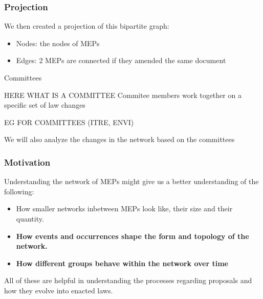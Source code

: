 \documentclass{beamer}
\begin{document}
\begin{frame}
\frametitle{Projection}

We then created a projection of this bipartite graph:

\begin{itemize}
	\pause \item Nodes: the nodes of MEPs
	\pause \item Edges: 2 MEPs are connected if they amended the same document	
\end{itemize}



\end{frame}


\begin{frame}{Committees}

	HERE WHAT IS A COMMITTEE 
	\pause Commitee members work together on a specific set of law changes

	EG FOR COMMITTEES (ITRE, ENVI)
	\vspace{2mm}
	
	\pause We will also analyze the changes in the network based on the committees
	
\end{frame}

\begin{frame}
\frametitle{Motivation}

Understanding the network of MEPs might give us a better understanding of the following:

\bigskip

\begin{itemize}
	\pause \item How smaller networks inbetween MEPs look like, their size and their quantity.
	
	\pause \item \textbf{How events and occurrences shape the form and topology of the network.}
		
	\pause \item \textbf{How different groups behave within the network over time}

\end{itemize}

\pause All of these are helpful in understanding the processes regarding proposals and how they evolve into enacted laws.

\end{frame}
\end{document}
